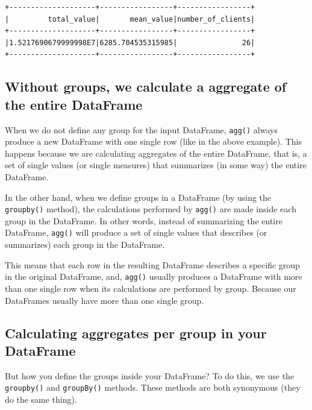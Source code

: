 \documentclass[
  11pt,
  letterpaper,
  DIV=11,
  numbers=noendperiod]{scrreprt}
\begin{document}
\begin{verbatim}
+--------------------+-----------------+-----------------+
|         total_value|       mean_value|number_of_clients|
+--------------------+-----------------+-----------------+
|1.5217690679999998E7|6285.704535315985|               26|
+--------------------+-----------------+-----------------+
\end{verbatim}

\hypertarget{without-groups-we-calculate-a-aggregate-of-the-entire-dataframe}{%
\subsection{Without groups, we calculate a aggregate of the entire
DataFrame}\label{without-groups-we-calculate-a-aggregate-of-the-entire-dataframe}}

When we do not define any group for the input DataFrame, \texttt{agg()}
always produce a new DataFrame with one single row (like in the above
example). This happens because we are calculating aggregates of the
entire DataFrame, that is, a set of single values (or single measures)
that summarizes (in some way) the entire DataFrame.

In the other hand, when we define groups in a DataFrame (by using the
\texttt{groupby()} method), the calculations performed by \texttt{agg()}
are made inside each group in the DataFrame. In other words, instead of
summarizing the entire DataFrame, \texttt{agg()} will produce a set of
single values that describes (or summarizes) each group in the
DataFrame.

This means that each row in the resulting DataFrame describes a specific
group in the original DataFrame, and, \texttt{agg()} usually produces a
DataFrame with more than one single row when its calculations are
performed by group. Because our DataFrames usually have more than one
single group.

\hypertarget{calculating-aggregates-per-group-in-your-dataframe}{%
\subsection{Calculating aggregates per group in your
DataFrame}\label{calculating-aggregates-per-group-in-your-dataframe}}

But how you define the groups inside your DataFrame? To do this, we use
the \texttt{groupby()} and \texttt{groupBy()} methods. These methods are
both synonymous (they do the same thing).
\end{document}
